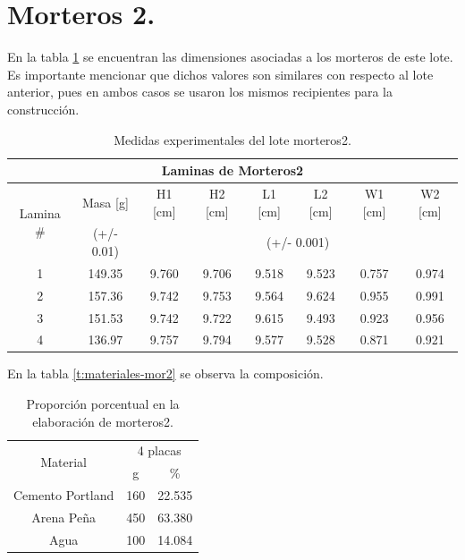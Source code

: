  \section{Morteros 2.}
 
 En la tabla \ref{t:medidas-morteros2} se encuentran las dimensiones asociadas a los morteros de este lote. Es importante mencionar que dichos valores son similares con respecto al lote anterior, pues en ambos casos se usaron los mismos recipientes para la construcción.
 
 
 \begin{table}[H]
 	\centering
 	\begin{tabular}{|c|c|c|c|c|c|c|c|}
 		\hline
 		\multicolumn{8}{|c|}{Laminas de Morteros2}                                                                             \\ \hline
 		\multirow{2}{*}{Lamina \#} & Masa {[}g{]} & H1 {[}cm{]} & H2 {[}cm{]} & L1 {[}cm{]} & L2 {[}cm{]} & W1 {[}cm{]} & W2 {[}cm{]} \\ \cline{2-8} 
 		& (+/- 0.01)   & \multicolumn{6}{c|}{(+/- 0.001)}                                                  \\ \hline
 		1                          & 149.35       & 9.760       & 9.706      &9.518         & 9.523      & 0.757       & 0.974       \\ \hline
 		2                          & 157.36       & 9.742       & 9.753      &9.564         & 9.624      & 0.955       & 0.991       \\ \hline
 		3                          & 151.53       & 9.742       & 9.722      &9.615         & 9.493      & 0.923       & 0.956       \\ \hline
 		4                          & 136.97       & 9.757       & 9.794      &9.577         & 9.528      & 0.871       & 0.921       \\ \hline
 	\end{tabular}
 	\caption{Medidas experimentales del lote morteros2.}
 	\label{t:medidas-morteros2}
 \end{table}
 
 En la tabla \ref{t:materiales-mor2} se observa la composición.
 
 \begin{table}[H]
 	\centering
 	\begin{tabular}{|c|c|c|}
 		\hline
 		\multirow{2}{*}{Material} & \multicolumn{2}{c|}{4 placas} \\ \cline{2-3}
 		& g         	& \%        	\\ \hline
 		Cemento Portland      	& 160      	& 22.535    	\\ \hline
 		Arena Peña         	& 450      	& 63.380    	\\ \hline
 		Agua                  	& 100     	& 14.084     	\\ \hline
 	\end{tabular}
 	\caption{Proporción porcentual en la elaboración de morteros2.}
 	\label{t:materiales-morteros2}
 \end{table}
 
